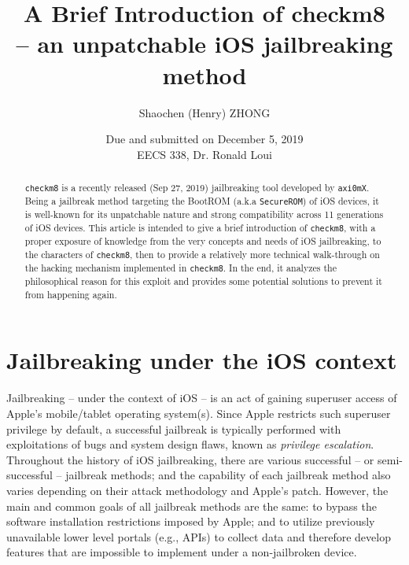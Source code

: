 \documentclass[10pt]{article}
\newcommand{\inlinecode}{\texttt}
\begin{document}
\linespread{1}


\title{\textbf{A Brief Introduction of checkm8} \\
        \large \textbf{-- an unpatchable iOS jailbreaking method\\}}

\author{Shaochen (Henry) ZHONG}
\date{Due and submitted on December 5, 2019\\EECS 338, Dr. Ronald Loui}
\maketitle

\begin{abstract}
    \inlinecode{checkm8} is a recently released (Sep 27, 2019) jailbreaking tool developed by \inlinecode{axi0mX}. Being a jailbreak method targeting the BootROM (a.k.a \inlinecode{SecureROM}) of iOS devices, it is well-known for its unpatchable nature and strong compatibility across 11 generations of iOS devices. This article is intended to give a brief introduction of \inlinecode{checkm8}, with a proper exposure of knowledge from the very concepts and needs of iOS jailbreaking, to the characters of \inlinecode{checkm8}, then to provide a relatively more technical walk-through on the hacking mechanism implemented in \inlinecode{checkm8}. In the end, it analyzes the philosophical reason for this exploit and provides some potential solutions to prevent it from happening again.
\end{abstract}





\vspace{0.5cm}
{\hypersetup{hidelinks}
\tableofcontents
}


\newpage

\section{Jailbreaking under the iOS context}

Jailbreaking -- under the context of iOS -- is an act of gaining superuser access of Apple's mobile/tablet operating system(s). Since Apple restricts such superuser privilege by default, a successful jailbreak is typically performed with exploitations of bugs and system design flaws, known as \textit{privilege escalation}. Throughout the history of iOS jailbreaking, there are various successful -- or semi-successful -- jailbreak methods; and the capability of each jailbreak method also varies depending on their attack methodology and Apple's patch. However, the main and common goals of all jailbreak methods are the same: to bypass the software installation restrictions imposed by Apple; and to utilize previously unavailable lower level portals (e.g., APIs) to collect data and therefore develop features that are impossible to implement under a non-jailbroken device.
\end{document}
